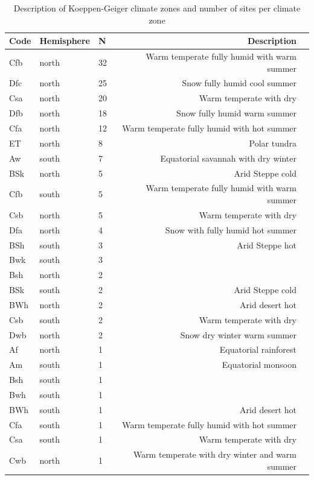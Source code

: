 \documentclass{myreport}
\begin{document}
\begin{table}
\centering
\begin{tabular}{lllrl}
  \hline
  Code & Hemisphere & N & Description \\ 
  \hline
  Cfb & north & 32 & Warm temperate fully humid with warm summer \\ 
  Dfc & north & 25 & Snow fully humid cool summer \\ 
  Csa & north & 20 & Warm temperate with dry \\ 
  Dfb & north & 18 & Snow fully humid warm summer \\ 
  Cfa & north & 12 & Warm temperate fully humid with hot summer \\ 
  ET & north & 8 & Polar tundra \\ 
  Aw & south & 7 & Equatorial savannah with dry winter \\ 
  BSk & north & 5 & Arid Steppe cold \\ 
  Cfb & south & 5 & Warm temperate fully humid with warm summer \\ 
   Csb & north & 5 & Warm temperate with dry \\ 
   Dfa & north & 4 & Snow with fully humid hot summer \\ 
   BSh & south & 3 & Arid Steppe hot \\ 
   Bwk & south & 3 &  \\ 
   Bsh & north & 2 &  \\ 
   BSk & south & 2 & Arid Steppe cold \\ 
   BWh & north & 2 & Arid desert hot \\ 
   Csb & south & 2 & Warm temperate with dry \\ 
   Dwb & north & 2 & Snow dry winter warm summer \\ 
   Af & north & 1 & Equatorial rainforest \\ 
   Am & south & 1 & Equatorial monsoon \\ 
   Bsh & south & 1 &  \\ 
   Bwh & south & 1 &  \\ 
   BWh & south & 1 & Arid desert hot \\ 
   Cfa & south & 1 & Warm temperate fully humid with hot summer \\ 
   Csa & south & 1 & Warm temperate with dry \\ 
   Cwb & north & 1 & Warm temperate with dry winter and warm summer \\ 
   \hline
  \end{tabular}
\caption{Description of Koeppen-Geiger climate zones and number of sites per climate zone } 
\end{table}
\end{document}
